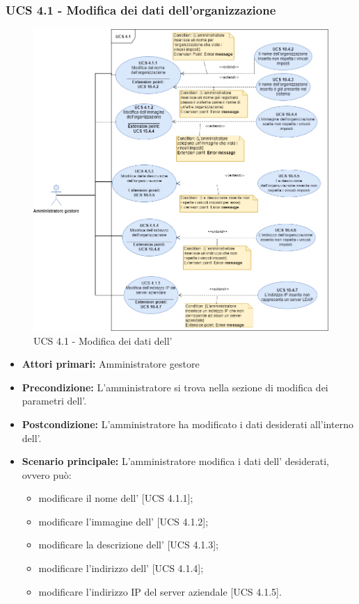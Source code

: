 \subsubsection{UCS 4.1 - Modifica dei dati dell'organizzazione}%
\begin{figure}[h]
	\centering
	\includegraphics[scale=0.53]{Sezioni/UseCase/Immagini/UCS4.1.png}
	\caption{UCS 4.1 - Modifica dei dati dell'}
\end{figure}
\begin{itemize}
	\item \textbf{Attori primari:} Amministratore gestore
	\item \textbf{Precondizione:} L'amministratore si trova nella sezione di modifica dei parametri dell'.
	\item \textbf{Postcondizione:} L'amministratore ha modificato i dati desiderati all'interno dell'.
	\item \textbf{Scenario principale:} L'amministratore modifica i dati dell' desiderati, ovvero può:
	\begin{itemize}
		\item modificare il nome dell' [UCS 4.1.1];
		\item modificare l'immagine dell' [UCS 4.1.2];
		\item modificare la descrizione dell' [UCS 4.1.3];
		\item modificare l'indirizzo dell' [UCS 4.1.4];
		\item modificare l'indirizzo IP del server aziendale [UCS 4.1.5].
	\end{itemize}
\end{itemize}

